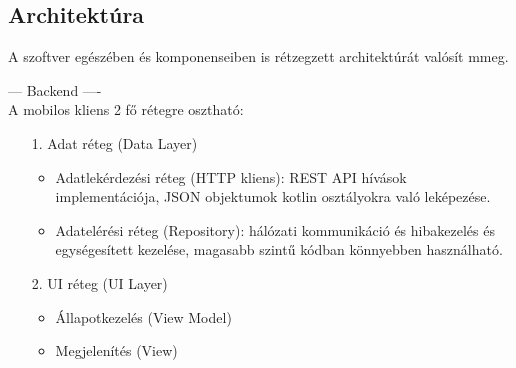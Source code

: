 \subsection{Architektúra}

A szoftver egészében és komponenseiben is rétzegzett architektúrát valósít mmeg.

--- Backend ----
\\




\noindent A mobilos kliens 2 fő rétegre osztható:

\begin{itemize}
    \item  [1.] Adat réteg (Data Layer)
    \begin{itemize}
        \item Adatlekérdezési réteg (HTTP kliens): REST API hívások implementációja, JSON objektumok kotlin osztályokra való leképezése.
        \item Adatelérési réteg (Repository): hálózati kommunikáció és hibakezelés és egységesített kezelése, magasabb szintű kódban könnyebben használható.
    \end{itemize}
    \item  [2.] UI réteg (UI Layer)
    \begin{itemize}
        \item  Állapotkezelés (View Model)
        \item  Megjelenítés (View)

    \end{itemize}
\end{itemize}